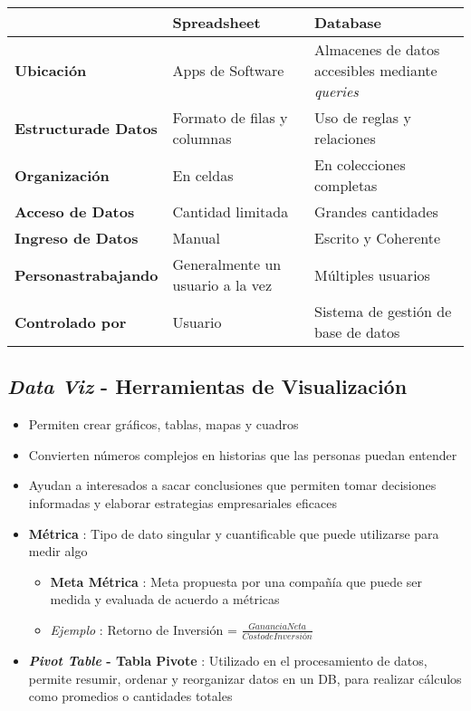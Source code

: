 \begin{table}
    \centering
    \begin{tabular}{|p{3.5cm}|p{5.5cm}|p{5.5cm}|}
        \hline
        & \textbf{Spreadsheet} & \textbf{Database} \\
        \hline
        \textbf{Ubicación} & Apps de Software & Almacenes de datos accesibles mediante \textit{queries} \\
        \hline
        \textbf{Estructura\break de Datos} & Formato de filas y columnas & Uso de reglas y relaciones \\
        \hline
        \textbf{Organización} & En celdas & En colecciones completas \\
        \hline
        \textbf{Acceso de Datos} & Cantidad limitada & Grandes cantidades \\
        \hline
        \textbf{Ingreso de Datos} & Manual & Escrito y Coherente \\
        \hline
        \textbf{Personas\break trabajando} & Generalmente un usuario a la vez & Múltiples usuarios \\
        \hline
        \textbf{Controlado por} & Usuario & Sistema de gestión de base de datos \\
        \hline
    \end{tabular}
\end{table}

\subsection{\textit{Data Viz} - Herramientas de Visualización}
\begin{itemize}
    \item {Permiten crear gráficos, tablas, mapas y cuadros}
    \item {Convierten números complejos en historias que las personas puedan entender}
    \item {Ayudan a interesados a sacar conclusiones que permiten tomar decisiones informadas y elaborar estrategias empresariales eficaces}
    \item {\textbf{Métrica} : Tipo de dato singular y cuantificable que puede utilizarse para medir algo
    \begin{itemize}
        \item {\textbf{Meta Métrica} : Meta propuesta por una compañía que puede ser medida y evaluada de acuerdo a métricas}
        \item {\textit{Ejemplo} : Retorno de Inversión = $\frac{Ganancia Neta}{Costo de Inversión}$}
    \end{itemize}}
    \item {\textbf{\textit{Pivot Table} - Tabla Pivote} : Utilizado en el procesamiento de datos, permite resumir, ordenar y reorganizar datos en un DB, para realizar cálculos como promedios o cantidades totales}
\end{itemize}

